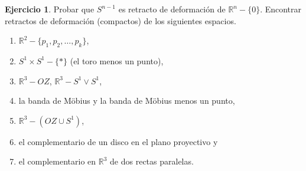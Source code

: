\documentclass{article}
\theoremstyle{plain}
\theoremstyle{definition}
\newtheorem{exercise}{Ejercicio}
\newcommand{\R}{\mathbb{R}}
\begin{document}
\begin{exercise}
Probar que $S^{n-1}$ es retracto de deformación de $\R^n-\{0\}$. Encontrar retractos de deformación (compactos) de los siguientes espacios.
\begin{enumerate}
\item $\R^2-\{p_1,p_2,\dotsc,p_k\}$,
\item $S^1\times S^1-\{*\}$ (el toro menos un punto),
\item $\R^3-OZ$, $\R^3-S^1\lor S^1$,
\item la banda de Möbius y la banda de Möbius menos un punto,
\item $\R^3-(OZ\cup S^1)$,
\item el complementario de un disco en el plano proyectivo y
\item el complementario en $\R^3$ de dos rectas paralelas.
\end{enumerate}
\end{exercise}
\end{document}
